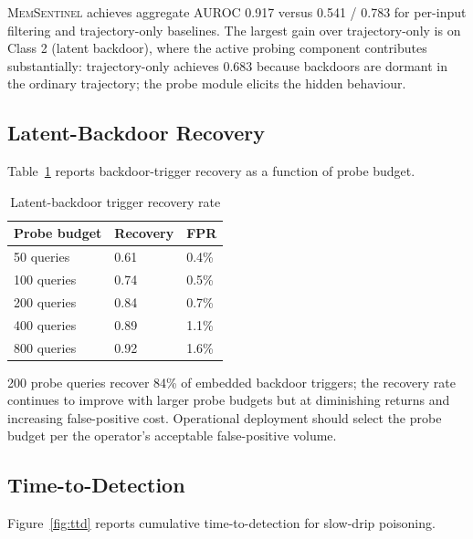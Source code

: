 \documentclass[sigconf,nonacm]{acmart}
\begin{document}
\textsc{MemSentinel} achieves aggregate AUROC 0.917 versus 0.541 /
0.783 for per-input filtering and trajectory-only baselines. The
largest gain over trajectory-only is on Class 2 (latent backdoor),
where the active probing component contributes substantially:
trajectory-only achieves 0.683 because backdoors are dormant in
the ordinary trajectory; the probe module elicits the hidden
behaviour.

\subsection{Latent-Backdoor Recovery}

Table~\ref{tab:backdoor} reports backdoor-trigger recovery as a
function of probe budget.

\begin{table}[h]
\caption{Latent-backdoor trigger recovery rate}
\label{tab:backdoor}
\small
\begin{tabularx}{\columnwidth}{@{}p{3.0cm}X X@{}}
\toprule
\textbf{Probe budget} & \textbf{Recovery} & \textbf{FPR} \\
\midrule
50 queries     & 0.61 & 0.4\% \\
100 queries    & 0.74 & 0.5\% \\
200 queries    & 0.84 & 0.7\% \\
400 queries    & 0.89 & 1.1\% \\
800 queries    & 0.92 & 1.6\% \\
\bottomrule
\end{tabularx}
\end{table}

200 probe queries recover 84\% of embedded backdoor triggers; the
recovery rate continues to improve with larger probe budgets but at
diminishing returns and increasing false-positive cost. Operational
deployment should select the probe budget per the operator's
acceptable false-positive volume.

\subsection{Time-to-Detection}

Figure~\ref{fig:ttd} reports cumulative time-to-detection for
slow-drip poisoning.
\end{document}
